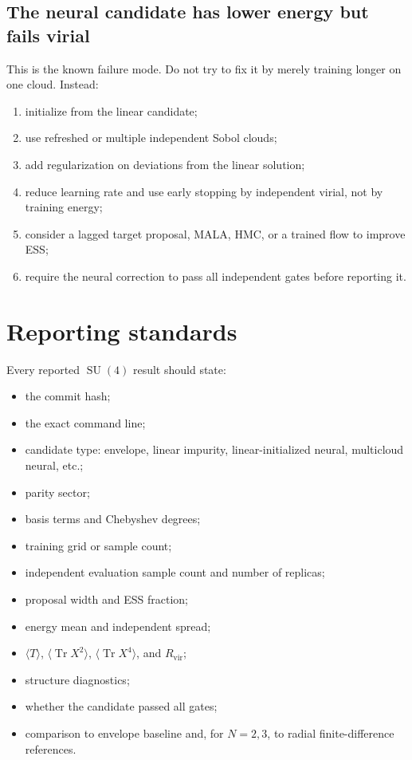 \documentclass[11pt]{article}
\newcommand{\Tr}{\operatorname{Tr}}
\newcommand{\Rvir}{R_{\mathrm{vir}}}
\newcommand{\SU}{\operatorname{SU}}
\begin{document}
\subsection{The neural candidate has lower energy but fails virial}

This is the known failure mode. Do not try to fix it by merely training longer on one cloud. Instead:
\begin{enumerate}
\item initialize from the linear candidate;
\item use refreshed or multiple independent Sobol clouds;
\item add regularization on deviations from the linear solution;
\item reduce learning rate and use early stopping by independent virial, not by training energy;
\item consider a lagged target proposal, MALA, HMC, or a trained flow to improve ESS;
\item require the neural correction to pass all independent gates before reporting it.
\end{enumerate}

\section{Reporting standards}

Every reported \(\SU(4)\) result should state:
\begin{itemize}
\item the commit hash;
\item the exact command line;
\item candidate type: envelope, linear impurity, linear-initialized neural, multicloud neural, etc.;
\item parity sector;
\item basis terms and Chebyshev degrees;
\item training grid or sample count;
\item independent evaluation sample count and number of replicas;
\item proposal width and ESS fraction;
\item energy mean and independent spread;
\item \(\langle T\rangle\), \(\langle\Tr X^2\rangle\), \(\langle\Tr X^4\rangle\), and \(\Rvir\);
\item structure diagnostics;
\item whether the candidate passed all gates;
\item comparison to envelope baseline and, for \(N=2,3\), to radial finite-difference references.
\end{itemize}
\end{document}
